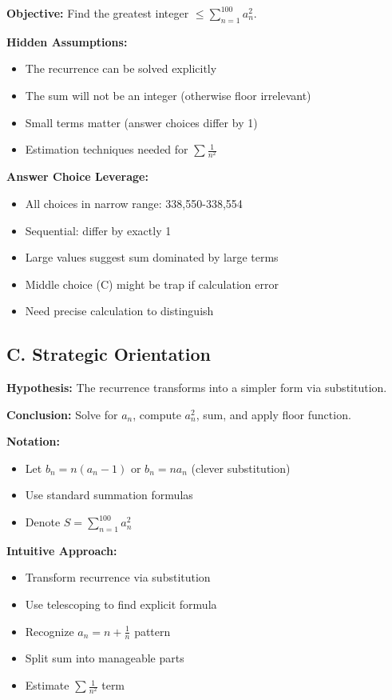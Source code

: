 \documentclass[12pt]{article}
\begin{document}
\begin{problemconfigbox}
\textbf{Objective:} Find the greatest integer $\leq \sum_{n=1}^{100} a_n^2$.

\textbf{Hidden Assumptions:}
\begin{itemize}
    \item The recurrence can be solved explicitly
    \item The sum will not be an integer (otherwise floor irrelevant)
    \item Small terms matter (answer choices differ by 1)
    \item Estimation techniques needed for $\sum \frac{1}{n^2}$
\end{itemize}

\textbf{Answer Choice Leverage:}
\begin{itemize}
    \item All choices in narrow range: 338,550-338,554
    \item Sequential: differ by exactly 1
    \item Large values suggest sum dominated by large terms
    \item Middle choice (C) might be trap if calculation error
    \item Need precise calculation to distinguish
\end{itemize}

\subsection*{C. Strategic Orientation}

\textbf{Hypothesis:} The recurrence transforms into a simpler form via substitution.

\textbf{Conclusion:} Solve for $a_n$, compute $a_n^2$, sum, and apply floor function.

\textbf{Notation:}
\begin{itemize}
    \item Let $b_n = n(a_n - 1)$ or $b_n = na_n$ (clever substitution)
    \item Use standard summation formulas
    \item Denote $S = \sum_{n=1}^{100} a_n^2$
\end{itemize}

\textbf{Intuitive Approach:} 
\begin{itemize}
    \item Transform recurrence via substitution
    \item Use telescoping to find explicit formula
    \item Recognize $a_n = n + \frac{1}{n}$ pattern
    \item Split sum into manageable parts
    \item Estimate $\sum \frac{1}{n^2}$ term
\end{itemize}


\end{problemconfigbox}
\end{document}
